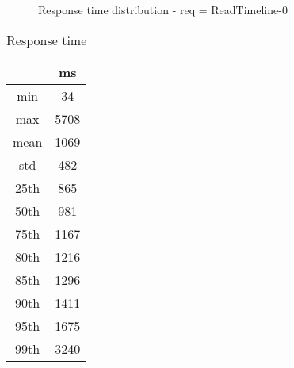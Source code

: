 \begin{minipage}{0.75\linewidth}
\begin{figure}[h]
\begin{adjustbox}{max width=1.0\linewidth, keepaspectratio}
  \end{adjustbox}
  \caption{Response time distribution - req = ReadTimeline-0}
\end{figure}
\end{minipage}\hfill\begin{minipage}{0.18\linewidth}
\begin{table}[h]
\begin{tabular}{|cc|}
\hline
\textbf{} & \textbf{ms}\\ \hline
 \Xhline{0.005\arrayrulewidth}
min & 34\\
 \Xhline{0.005\arrayrulewidth}
max & 5708\\
 \Xhline{0.005\arrayrulewidth}
mean & 1069\\
 \Xhline{0.005\arrayrulewidth}
std & 482\\
\hline
\hline
 \Xhline{0.005\arrayrulewidth}
25th & 865\\
 \Xhline{0.005\arrayrulewidth}
50th & 981\\
 \Xhline{0.005\arrayrulewidth}
75th & 1167\\
 \Xhline{0.005\arrayrulewidth}
80th & 1216\\
 \Xhline{0.005\arrayrulewidth}
85th & 1296\\
 \Xhline{0.005\arrayrulewidth}
90th & 1411\\
 \Xhline{0.005\arrayrulewidth}
95th & 1675\\
 \Xhline{0.005\arrayrulewidth}
99th & 3240\\
\hline
\end{tabular}
\caption{Response time}
\end{table}
\end{minipage}\hfill